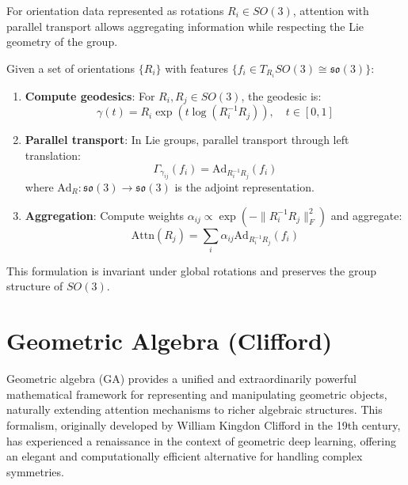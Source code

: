 \begin{example}\label{ex:attention_so3}
For orientation data represented as rotations $R_i \in SO(3)$, attention with parallel transport allows aggregating information while respecting the Lie geometry of the group.

Given a set of orientations $\{R_i\}$ with features $\{f_i \in T_{R_i}SO(3) \cong \mathfrak{so}(3)\}$:

\begin{enumerate}
    \item \textbf{Compute geodesics}: For $R_i, R_j \in SO(3)$, the geodesic is:
    \begin{equation}
    \gamma(t) = R_i \exp(t \log(R_i^{-1} R_j)), \quad t \in [0,1]
    \end{equation}

    \item \textbf{Parallel transport}: In Lie groups, parallel transport through left translation:
    \begin{equation}
    \Gamma_{\gamma_{ij}}(f_i) = \text{Ad}_{R_i^{-1}R_j}(f_i)
    \end{equation}
    where $\text{Ad}_R: \mathfrak{so}(3) \to \mathfrak{so}(3)$ is the adjoint representation.

    \item \textbf{Aggregation}: Compute weights $\alpha_{ij} \propto \exp(-\|R_i^{-1}R_j\|_F^2)$ and aggregate:
    \begin{equation}
    \text{Attn}(R_j) = \sum_i \alpha_{ij} \text{Ad}_{R_i^{-1}R_j}(f_i)
    \end{equation}
\end{enumerate}

This formulation is invariant under global rotations and preserves the group structure of $SO(3)$.
\end{example}
\section{Geometric Algebra (Clifford)}\label{sec:clifford_attention}

Geometric algebra (GA) provides a unified and extraordinarily powerful mathematical framework for representing and manipulating geometric objects, naturally extending attention mechanisms to richer algebraic structures. This formalism, originally developed by William Kingdon Clifford in the 19th century, has experienced a renaissance in the context of geometric deep learning, offering an elegant and computationally efficient alternative for handling complex symmetries.

